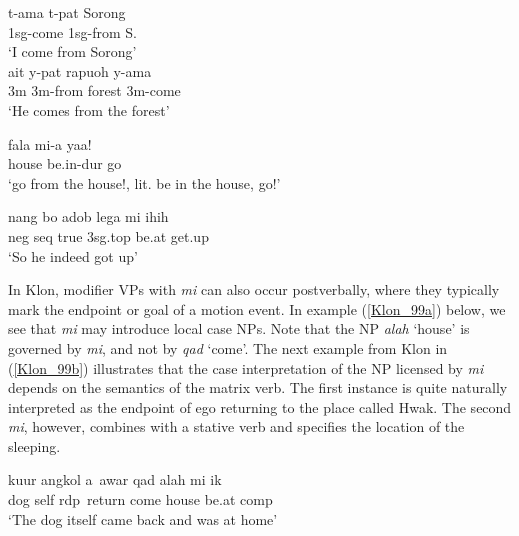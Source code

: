 \pex \label{Maybrat_60}
\a
\gll t-ama t-pat Sorong \\
1\acs{sg}-come 1\acs{sg}-from S. \\
\glft `I come from Sorong' \\ 
\z
\a
\gll ait y-pat rapuoh y-ama \\ 
3\acs{m} 3\acs{m}-from forest 3\acs{m}-come \\
\glft `He comes from the forest' \\ 
\z
\xe

\ea \label{Abui_24}
\gll fala mi-a yaa! \\
house be.in-\acs{dur} go \\
\glft `go from the house!, lit. be in the house, go!’ \\ 
\z
\xe

\ea \label{Klon_48}
\gll nang bo adob lega mi ihih \\
\acs{neg} \acs{seq} true 3\acs{sg}.\acs{top} be.at get.up \\
\glft `So he indeed got up' \\ 
\z
\xe

In Klon, modifier VPs with \textit{mi} can also occur postverbally, where they typically mark the endpoint or goal of a motion event. In example (\ref{Klon_99a}) below, we see that \textit{mi} may introduce local case NPs. Note that the NP \textit{alah} `house' is governed by \textit{mi}, and not by \textit{qad} `come'. The next example from Klon in (\ref{Klon_99b}) illustrates that the case interpretation of the NP licensed by \textit{mi} depends on the semantics of the matrix verb. The first instance is quite naturally interpreted as the endpoint of ego returning to the place called Hwak. The second \textit{mi}, however, combines with a stative verb and specifies the location of the sleeping.

\ea \label{Klon_99a}
\gll kuur angkol a~awar qad alah mi ik \\
dog self \acs{rdp}~return come house be.at \acs{comp} \\
\glft `The dog itself came back and was at home' \\ 
\z
\xe

